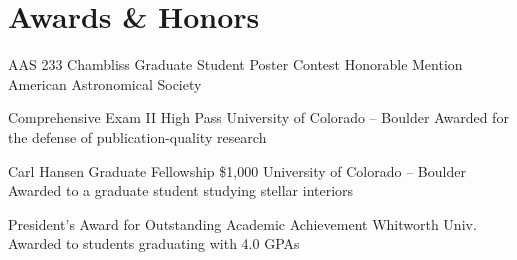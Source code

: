 \section{Awards \& Honors}

		{AAS 233 Chambliss Graduate Student Poster Contest}
		{Honorable Mention}
		{American Astronomical Society}
		{}
		{}

		{Comprehensive Exam II High Pass}
		{}
		{University of Colorado -- Boulder}
		{}
		{Awarded for the defense of publication-quality research}

        {Carl Hansen Graduate Fellowship}
        {\$1,000}
        {University of Colorado -- Boulder}
        {}
        {Awarded to a graduate student studying stellar interiors}


        {President's Award for Outstanding Academic Achievement}
        {}
        {Whitworth Univ.}
        {}
        {Awarded to students graduating with 4.0 GPAs}

